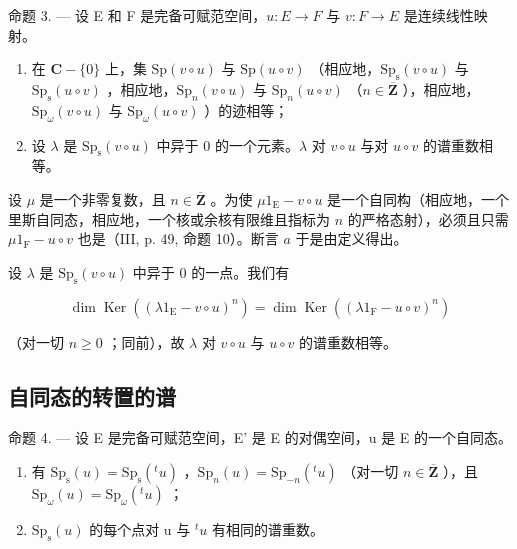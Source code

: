 命题 3. --- 设 E 和 F 是完备可赋范空间，\(u\colon E\to F\) 与 \(v\colon F\to E\) 是连续线性映射。

\begin{enumerate}
\def\labelenumi{\alph{enumi})}
\item
  在 \(\mathbf{C} - \{0\}\) 上，集 \(\mathrm{Sp}(v \circ u)\) 与 \(\mathrm{Sp}(u \circ v)\) （相应地，\(\mathrm{Sp}_{\mathrm{s}}(v \circ u)\) 与 \(\mathrm{Sp}_{\mathrm{s}}(u \circ v)\) ，相应地，\(\mathrm{Sp}_{n}(v \circ u)\) 与 \(\mathrm{Sp}_{n}(u \circ v)\) （\(n \in \overline{\mathbf{Z}}\) ），相应地，\(\mathrm{Sp}_{\omega}(v \circ u)\) 与 \(\mathrm{Sp}_{\omega}(u \circ v)\) ）的迹相等；
\item
  设 \(\lambda\) 是 \(\mathrm{Sp}_{\mathrm{s}}(v \circ u)\) 中异于 0 的一个元素。\(\lambda\) 对 \(v \circ u\) 与对 \(u \circ v\) 的谱重数相等。
\end{enumerate}

设 \(\mu\) 是一个非零复数，且 \(n \in \overline{\mathbf{Z}}\) 。为使 \(\mu 1_{\mathrm{E}} - v \circ u\) 是一个自同构（相应地，一个里斯自同态，相应地，一个核或余核有限维且指标为 \(n\) 的严格态射），必须且只需 \(\mu 1_{\mathrm{F}} - u \circ v\) 也是（III, p. 49, 命题 10）。断言 \(a\) 于是由定义得出。

设 \(\lambda\) 是 \(\mathrm{Sp}_{\mathrm{s}}(v \circ u)\) 中异于 0 的一点。我们有

\[
\dim \operatorname{Ker} ((\lambda 1 _ {\mathrm{E}} - v \circ u) ^ {n}) = \dim \operatorname{Ker} ((\lambda 1 _ {\mathrm{F}} - u \circ v) ^ {n})
\]

（对一切 \(n \geqslant 0\) ；同前），故 \(\lambda\) 对 \(v \circ u\) 与 \(u \circ v\) 的谱重数相等。

\subsection{自同态的转置的谱}

命题 4. --- 设 E 是完备可赋范空间，E' 是 E 的对偶空间，u 是 E 的一个自同态。

\begin{enumerate}
\def\labelenumi{\alph{enumi})}
\item
  有 \(\mathrm{Sp}_{\mathrm{s}}(u) = \mathrm{Sp}_{\mathrm{s}}(^{t}u)\) ，\(\mathrm{Sp}_n(u) = \mathrm{Sp}_{-n}(^t u)\) （对一切 \(n \in \overline{\mathbf{Z}}\) ），且 \(\mathrm{Sp}_{\omega}(u) = \mathrm{Sp}_{\omega}(^t u)\) ；
\item
  \(\mathrm{Sp}_{\mathrm{s}}(u)\) 的每个点对 u 与 \({}^{t}u\) 有相同的谱重数。
\end{enumerate}

